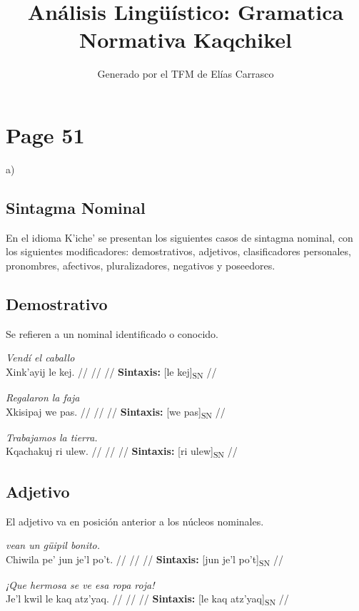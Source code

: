 \documentclass{article}%
\title{Análisis Lingüístico: Gramatica Normativa Kaqchikel}%
\author{Generado por el TFM de Elías Carrasco}%
\begin{document}
%
\normalsize%
\maketitle%
\section{Page 51}%
\label{sec:Page51}%
a) %
\subsection{Sintagma Nominal}%
\label{subsec:SintagmaNominal}%

%
En el idioma K'iche' se presentan los siguientes casos de sintagma nominal, con los %
siguientes modificadores: demostrativos, adjetivos, clasificadores personales, pronombres, %
afectivos, pluralizadores, negativos y poseedores. %
\subsection{Demostrativo}%
\label{subsec:Demostrativo}%

%
Se refieren a un nominal identificado o conocido. %
\par\medskip%
\ex
\textit{Vendí el caballo} \\
\begingl
\gla Xink'ayij le kej. //
\glb  //
\glc  //
\glft \textbf{Sintaxis:} [le kej]\textsubscript{SN} //
\endgl
\xe
%
\medskip%
\par\medskip%
\ex
\textit{Regalaron la faja} \\
\begingl
\gla Xkisipaj we pas. //
\glb  //
\glc  //
\glft \textbf{Sintaxis:} [we pas]\textsubscript{SN} //
\endgl
\xe
%
\medskip%
\par\medskip%
\ex
\textit{Trabajamos la tierra.} \\
\begingl
\gla Kqachakuj ri ulew. //
\glb  //
\glc  //
\glft \textbf{Sintaxis:} [ri ulew]\textsubscript{SN} //
\endgl
\xe
%
\medskip%
\subsection{Adjetivo}%
\label{subsec:Adjetivo}%

%
El adjetivo va en posición anterior a los núcleos nominales. %
\par\medskip%
\ex
\textit{vean un güipil bonito.} \\
\begingl
\gla Chiwila pe' jun je'l po't. //
\glb  //
\glc  //
\glft \textbf{Sintaxis:} [jun je'l po't]\textsubscript{SN} //
\endgl
\xe
%
\medskip%
\par\medskip%
\ex
\textit{¡Que hermosa se ve esa ropa roja!} \\
\begingl
\gla Je'l kwil le kaq atz'yaq. //
\glb  //
\glc  //
\glft \textbf{Sintaxis:} [le kaq atz'yaq]\textsubscript{SN} //
\endgl
\xe
%
\medskip%
\end{document}
